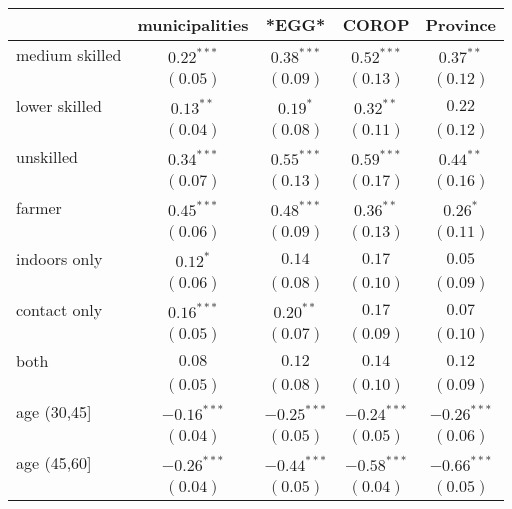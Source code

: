 
\begin{table}[h!]
\begin{center}
\begin{small}
\begin{tabular}{l c c c c}
\hline
 & municipalities & *EGG* & COROP & Province \\
\hline
medium skilled     & $0.22^{***}$  & $0.38^{***}$  & $0.52^{***}$  & $0.37^{**}$   \\
                   & $(0.05)$      & $(0.09)$      & $(0.13)$      & $(0.12)$      \\
lower skilled      & $0.13^{**}$   & $0.19^{*}$    & $0.32^{**}$   & $0.22$        \\
                   & $(0.04)$      & $(0.08)$      & $(0.11)$      & $(0.12)$      \\
unskilled          & $0.34^{***}$  & $0.55^{***}$  & $0.59^{***}$  & $0.44^{**}$   \\
                   & $(0.07)$      & $(0.13)$      & $(0.17)$      & $(0.16)$      \\
farmer             & $0.45^{***}$  & $0.48^{***}$  & $0.36^{**}$   & $0.26^{*}$    \\
                   & $(0.06)$      & $(0.09)$      & $(0.13)$      & $(0.11)$      \\
indoors only       & $0.12^{*}$    & $0.14$        & $0.17$        & $0.05$        \\
                   & $(0.06)$      & $(0.08)$      & $(0.10)$      & $(0.09)$      \\
contact only       & $0.16^{***}$  & $0.20^{**}$   & $0.17$        & $0.07$        \\
                   & $(0.05)$      & $(0.07)$      & $(0.09)$      & $(0.10)$      \\
both               & $0.08$        & $0.12$        & $0.14$        & $0.12$        \\
                   & $(0.05)$      & $(0.08)$      & $(0.10)$      & $(0.09)$      \\
age (30,45]        & $-0.16^{***}$ & $-0.25^{***}$ & $-0.24^{***}$ & $-0.26^{***}$ \\
                   & $(0.04)$      & $(0.05)$      & $(0.05)$      & $(0.06)$      \\
age (45,60]        & $-0.26^{***}$ & $-0.44^{***}$ & $-0.58^{***}$ & $-0.66^{***}$ \\
                   & $(0.04)$      & $(0.05)$      & $(0.04)$      & $(0.05)$      \\

\end{tabular}
\end{small}
\end{center}
\end{table}
